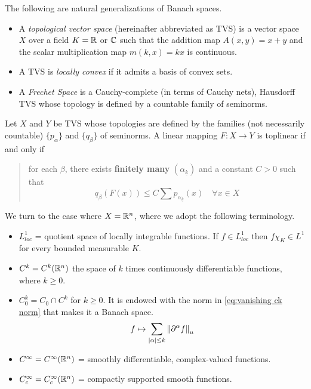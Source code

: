 \documentclass[../main-v2-manifolds.tex]{subfiles}
\begin{document}
The following are natural generalizations of Banach spaces.
\begin{itemize}
    \item A \emph{topological vector space} (hereinafter abbreviated as TVS) is a vector space $X$ over a field $K = \mathbb{R}$ or ${\mathbb{C}}$ such that the addition map $A(x,y) = x+y$ and the scalar multiplication map $m(k,x) = kx$ is continuous.
    \item A TVS is \emph{locally convex} if it admits a basis of convex sets.
    \item A \emph{Frechet Space} is a Cauchy-complete (in terms of Cauchy nets), Hausdorff TVS whose topology is defined by a countable family of seminorms.
\end{itemize}
Let $X$ and $Y$ be TVS whose topologies are defined by the families (not necessarily countable) $\{p_{\alpha}\}$ and $\{q_\beta\}$ of seminorms. A linear mapping $F:X\to Y$ is toplinear if and only if 
\begin{quote}
    for each $\beta$, there exists \textbf{finitely many} $(\alpha_{\underline{k}})$ and a constant $C>0$ such that 
    \[
        q_\beta(F(x))\leq C\sum p_{\alpha_{\underline{k}}}(x)\quad\forall x\in X
    \]
\end{quote}





We turn to the case where $X={\mathbb{R}^n}$, where we adopt the following terminology. 
\begin{itemize}
    \item $L^1_{loc}$ = quotient space of locally integrable functions. If $f\in L^1_{loc}$ then $f\chi_K\in L^1$ for every bounded measurable $K$.
    \item $C^k = C^k({\mathbb{R}^n})$ the space of $k$ times continuously differentiable functions, where $k\geq 0$.
    \item $C_0^k = C_0\cap C^k$ for $k\geq 0$. It is endowed with the norm in \cref{eq:vanishing ck norm} that makes it a Banach space.
    \begin{equation}
        f\mapsto \sum_{\vert {\alpha} \vert\leq k}\norm{\partial^\alpha f}_u
        \label{eq:vanishing ck norm}
    \end{equation}
    \item $C^\infty=C^\infty({\mathbb{R}^n})$ = smoothly differentiable, complex-valued functions.
    \item $C^\infty_c=C^\infty_c({\mathbb{R}^n})$ = compactly supported smooth functions.
\end{itemize}
\end{document}
